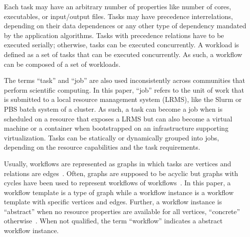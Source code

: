 Each task may have an arbitrary number of properties like number of cores,
executables, or input/output files. Tasks may have precedence interrelations,
depending on their data dependences or any other type of dependency mandated
by the application algorithms. Tasks with precedence relations have to be
executed serially; otherwise, tasks can be executed concurrently. A workload is
defined as a set of tasks that can be executed concurrently. As such, a
workflow can be composed of a set of workloads.

The terms ``task'' and ``job'' are also used inconsistently across communities
that perform scientific computing. In this paper, ``job'' refers to the unit of
work that is submitted to a local resource management system (LRMS), like the
Slurm or PBS batch system of a cluster. As such, a task can become a job when
is scheduled on a resource that exposes a LRMS but can also become a virtual
machine or a container when bootstrapped on an infrastructure supporting
virtualization. Tasks can be statically or dynamically grouped into jobs,
depending on the resource capabilities and the task requirements.

Usually, workflows are represented as graphs in which tasks are vertices and
relations are edges~\cite{}. Often, graphs are supposed to be acyclic but graphs
with cycles have been used to represent workflows of workflows~\cite{}. In this
paper, a workflow template is a type of graph while a workflow instance is a
workflow template with specific vertices and edges. Further, a workflow instance
is ``abstract'' when no resource properties are available for all vertices,
``concrete'' otherwise~\cite{}. When not qualified, the term ``workflow''
indicates a abstract workflow instance.
